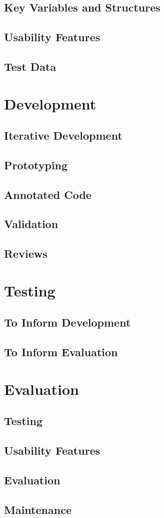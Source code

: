 \documentclass{article}
\begin{document}
    \subsection{Key Variables and Structures}
    \subsection{Usability Features}
    \subsection{Test Data}
    \newpage
    
    \section{Development}
    \subsection{Iterative Development}
    \subsection{Prototyping}
    \subsection{Annotated Code}
    \subsection{Validation}
    \subsection{Reviews}
    \newpage
    
    \section{Testing}
    \subsection{To Inform Development}
    \subsection{To Inform Evaluation}
    \newpage
    
    \section{Evaluation}
    \subsection{Testing}
    \subsection{Usability Features}
    \subsection{Evaluation}
    \subsection{Maintenance}
\end{document}
